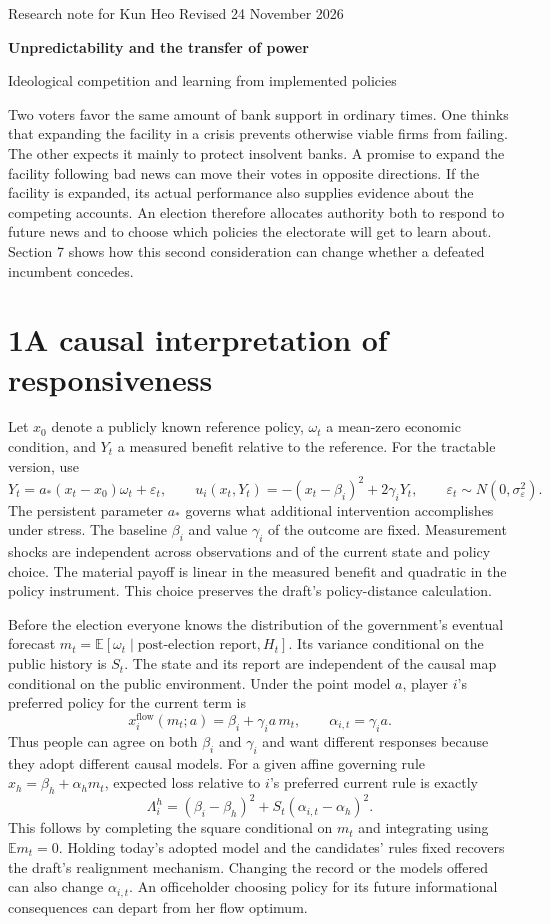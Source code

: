 \documentclass[11pt,letterpaper]{article}
\newcommand{\sect}[1]{\section*{\color{ink}#1}}
\newcommand{\E}{\mathbb E}
\begin{document}
\thispagestyle{plain}
{\small\sffamily\color{ink}Research note for Kun Heo \hfill Revised 24 November 2026}\par
{\LARGE\bfseries\color{ink}Unpredictability and the transfer of power\par}
{\large Ideological competition and learning from implemented policies\par}
\vspace{3pt}

Two voters favor the same amount of bank support in ordinary times. One thinks that expanding the facility in a crisis prevents otherwise viable firms from failing. The other expects it mainly to protect insolvent banks. A promise to expand the facility following bad news can move their votes in opposite directions. If the facility is expanded, its actual performance also supplies evidence about the competing accounts. An election therefore allocates authority both to respond to future news and to choose which policies the electorate will get to learn about. Section 7 shows how this second consideration can change whether a defeated incumbent concedes.

\sect{1\quad A causal interpretation of responsiveness}
Let $x_0$ denote a publicly known reference policy, $\omega_t$ a mean-zero economic condition, and $Y_t$ a measured benefit relative to the reference. For the tractable version, use
\[
 Y_t=a_*(x_t-x_0)\omega_t+\varepsilon_t,\qquad
 u_i(x_t,Y_t)=-(x_t-\beta_i)^2+2\gamma_iY_t ,
 \qquad \varepsilon_t\sim N(0,\sigma_\varepsilon^2).
\]
The persistent parameter $a_*$ governs what additional intervention accomplishes under stress. The baseline $\beta_i$ and value $\gamma_i$ of the outcome are fixed. Measurement shocks are independent across observations and of the current state and policy choice. The material payoff is linear in the measured benefit and quadratic in the policy instrument. This choice preserves the draft's policy-distance calculation.

Before the election everyone knows the distribution of the government's eventual forecast $m_t=\E[\omega_t\mid\text{post-election report},H_t]$. Its variance conditional on the public history is $S_t$. The state and its report are independent of the causal map conditional on the public environment. Under the point model $a$, player $i$'s preferred policy for the current term is
\[
 x^{\mathrm{flow}}_i(m_t;a)=\beta_i+\gamma_i a\,m_t,\qquad
 \alpha_{i,t}=\gamma_i a .
\]
Thus people can agree on both $\beta_i$ and $\gamma_i$ and want different responses because they adopt different causal models. For a given affine governing rule $x_h=\beta_h+\alpha_hm_t$, expected loss relative to $i$'s preferred current rule is exactly
\[
 \Lambda_i^h=(\beta_i-\beta_h)^2+S_t(\alpha_{i,t}-\alpha_h)^2 .
\]
This follows by completing the square conditional on $m_t$ and integrating using $\E m_t=0$. Holding today's adopted model and the candidates' rules fixed recovers the draft's realignment mechanism. Changing the record or the models offered can also change $\alpha_{i,t}$. An officeholder choosing policy for its future informational consequences can depart from her flow optimum.
\end{document}
